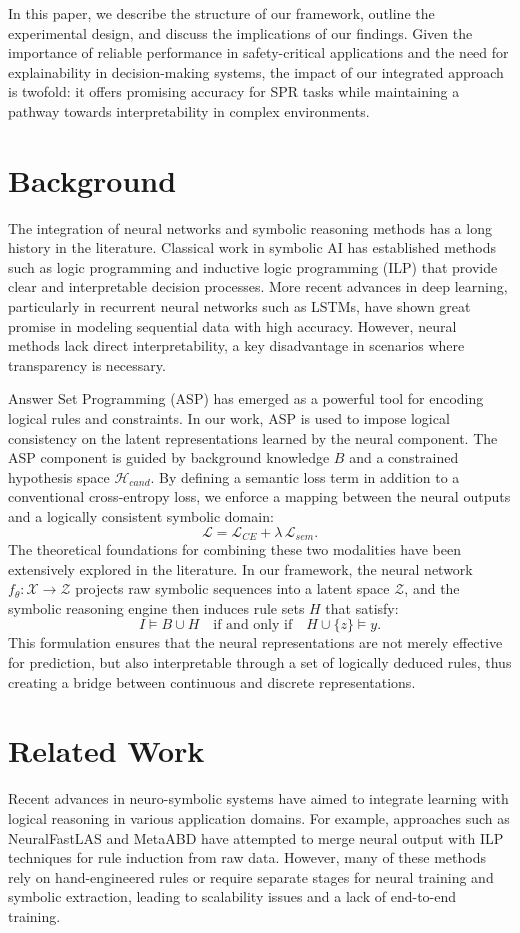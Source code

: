 \documentclass{article}
\begin{document}
In this paper, we describe the structure of our framework, outline the experimental design, and discuss the implications of our findings. Given the importance of reliable performance in safety-critical applications and the need for explainability in decision-making systems, the impact of our integrated approach is twofold: it offers promising accuracy for SPR tasks while maintaining a pathway towards interpretability in complex environments.

\section{Background}
The integration of neural networks and symbolic reasoning methods has a long history in the literature. Classical work in symbolic AI has established methods such as logic programming and inductive logic programming (ILP) that provide clear and interpretable decision processes. More recent advances in deep learning, particularly in recurrent neural networks such as LSTMs, have shown great promise in modeling sequential data with high accuracy. However, neural methods lack direct interpretability, a key disadvantage in scenarios where transparency is necessary.

Answer Set Programming (ASP) has emerged as a powerful tool for encoding logical rules and constraints. In our work, ASP is used to impose logical consistency on the latent representations learned by the neural component. The ASP component is guided by background knowledge \(B\) and a constrained hypothesis space \(\mathcal{H}_{cand}\). By defining a semantic loss term in addition to a conventional cross-entropy loss, we enforce a mapping between the neural outputs and a logically consistent symbolic domain:
\[
\mathcal{L} = \mathcal{L}_{CE} + \lambda\, \mathcal{L}_{sem}.
\]
The theoretical foundations for combining these two modalities have been extensively explored in the literature. In our framework, the neural network \(f_\theta: \mathcal{X} \rightarrow \mathcal{Z}\) projects raw symbolic sequences into a latent space \(\mathcal{Z}\), and the symbolic reasoning engine then induces rule sets \(H\) that satisfy:
\[
I \models B \cup H \quad \text{if and only if} \quad H \cup \{z\} \models y.
\]
This formulation ensures that the neural representations are not merely effective for prediction, but also interpretable through a set of logically deduced rules, thus creating a bridge between continuous and discrete representations.

\section{Related Work}
Recent advances in neuro-symbolic systems have aimed to integrate learning with logical reasoning in various application domains. For example, approaches such as NeuralFastLAS and MetaABD have attempted to merge neural output with ILP techniques for rule induction from raw data. However, many of these methods rely on hand-engineered rules or require separate stages for neural training and symbolic extraction, leading to scalability issues and a lack of end-to-end training.
\end{document}
